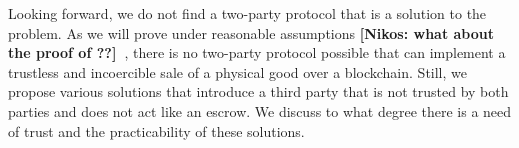 \documentclass{cacthesis}
\newcommand{\authnote}[3]{{ \footnotesize \textbf{#1[#2: #3]~}}}
\newcommand{\niknote}[1]{\authnote{\color{red}}{Nikos}{#1}}
\begin{document}
Looking forward, we do not find a two-party protocol that is a solution to the problem. As we will prove under reasonable assumptions \niknote{what about the proof of \cite{goharshady_irrationality_2021}??}, there is no two-party protocol possible that can implement a trustless and incoercible sale of a physical good over a blockchain. Still, we propose various solutions that introduce a third party that is not trusted by both parties and does not act like an escrow. We discuss to what degree there is a need of trust and the practicability of these solutions.  \newline


	
	
\end{document}
